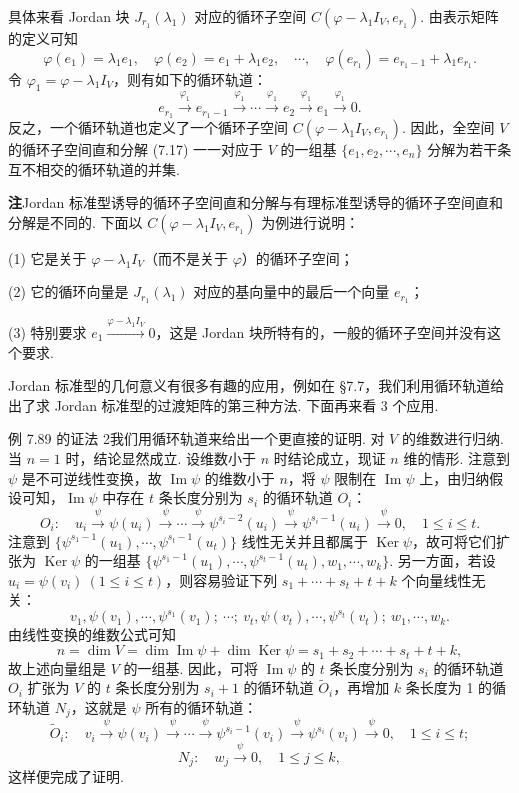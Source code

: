 \documentclass[UTF8, 12pt, fontset=fandol, oneside]{ctexart}
\begin{document}
具体来看 Jordan 块 $J_{r_1}(\lambda_1)$ 对应的循环子空间 $C(\varphi-\lambda_1I_V,e_{r_1})$. 由表示矩阵的定义可知
\[
\varphi(e_1)=\lambda_1e_1,\quad \varphi(e_2)=e_1+\lambda_1e_2,\quad \cdots,\quad \varphi(e_{r_1})=e_{r_1-1}+\lambda_1e_{r_1}.
\]
令 $\varphi_1=\varphi-\lambda_1I_V$，则有如下的循环轨道：
\[
e_{r_1}\xrightarrow{\varphi_1}e_{r_1-1}\xrightarrow{\varphi_1}\cdots\xrightarrow{\varphi_1}e_2\xrightarrow{\varphi_1}e_1\xrightarrow{\varphi_1}0.
\]
反之，一个循环轨道也定义了一个循环子空间 $C(\varphi-\lambda_1I_V,e_{r_1})$. 因此，全空间 $V$ 的循环子空间直和分解 (7.17) 一一对应于 $V$ 的一组基 $\{e_1,e_2,\cdots,e_n\}$ 分解为若干条互不相交的循环轨道的并集.

\noindent\textbf{注}\quad Jordan 标准型诱导的循环子空间直和分解与有理标准型诱导的循环子空间直和分解是不同的. 下面以 $C(\varphi-\lambda_1I_V,e_{r_1})$ 为例进行说明：

(1) 它是关于 $\varphi-\lambda_1I_V$（而不是关于 $\varphi$）的循环子空间；

(2) 它的循环向量是 $J_{r_1}(\lambda_1)$ 对应的基向量中的最后一个向量 $e_{r_1}$；

(3) 特别要求 $e_1\xrightarrow{\varphi-\lambda_1I_V}0$，这是 Jordan 块所特有的，一般的循环子空间并没有这个要求.

Jordan 标准型的几何意义有很多有趣的应用，例如在 §7.7，我们利用循环轨道给出了求 Jordan 标准型的过渡矩阵的第三种方法. 下面再来看 3 个应用.

例 7.89 的证法 2\quad 我们用循环轨道来给出一个更直接的证明. 对 $V$ 的维数进行归纳. 当 $n=1$ 时，结论显然成立. 设维数小于 $n$ 时结论成立，现证 $n$ 维的情形. 注意到 $\psi$ 是不可逆线性变换，故 $\operatorname{Im}\psi$ 的维数小于 $n$，将 $\psi$ 限制在 $\operatorname{Im}\psi$ 上，由归纳假设可知，$\operatorname{Im}\psi$ 中存在 $t$ 条长度分别为 $s_i$ 的循环轨道 $O_i$：
\[
O_i:\quad u_i\xrightarrow{\psi}\psi(u_i)\xrightarrow{\psi}\cdots\xrightarrow{\psi}\psi^{s_i-2}(u_i)\xrightarrow{\psi}\psi^{s_i-1}(u_i)\xrightarrow{\psi}0,\quad 1\le i\le t.
\]
注意到 $\{\psi^{s_1-1}(u_1),\cdots,\psi^{s_t-1}(u_t)\}$ 线性无关并且都属于 $\operatorname{Ker}\psi$，故可将它们扩张为 $\operatorname{Ker}\psi$ 的一组基 $\{\psi^{s_1-1}(u_1),\cdots,\psi^{s_t-1}(u_t),w_1,\cdots,w_k\}$. 另一方面，若设 $u_i=\psi(v_i)\ (1\le i\le t)$，则容易验证下列 $s_1+\cdots+s_t+t+k$ 个向量线性无关：
\[
v_1,\psi(v_1),\cdots,\psi^{s_1}(v_1);\ \cdots;\ v_t,\psi(v_t),\cdots,\psi^{s_t}(v_t);\ w_1,\cdots,w_k.
\]
由线性变换的维数公式可知
\[
n=\dim V=\dim\operatorname{Im}\psi+\dim\operatorname{Ker}\psi=s_1+s_2+\cdots+s_t+t+k,
\]
故上述向量组是 $V$ 的一组基. 因此，可将 $\operatorname{Im}\psi$ 的 $t$ 条长度分别为 $s_i$ 的循环轨道 $O_i$ 扩张为 $V$ 的 $t$ 条长度分别为 $s_i+1$ 的循环轨道 $\widetilde O_i$，再增加 $k$ 条长度为 1 的循环轨道 $N_j$，这就是 $\psi$ 所有的循环轨道：
\[
\widetilde O_i:\quad v_i\xrightarrow{\psi}\psi(v_i)\xrightarrow{\psi}\cdots\xrightarrow{\psi}\psi^{s_i-1}(v_i)\xrightarrow{\psi}\psi^{s_i}(v_i)\xrightarrow{\psi}0,\quad 1\le i\le t;
\]
\[
N_j:\quad w_j\xrightarrow{\psi}0,\quad 1\le j\le k,
\]
这样便完成了证明.
\end{document}
